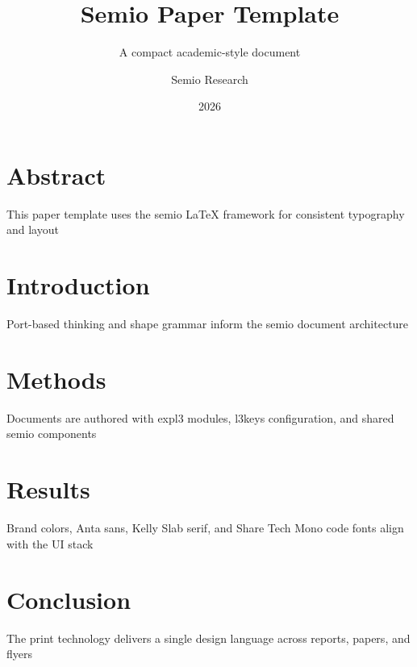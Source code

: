 \documentclass[type=paper,theme=light,language=en]{semio}
\title{Semio Paper Template}
\author{Semio Research}
\date{2026}
\subtitle{A compact academic-style document}
\begin{document}
\maketitle

\section{Abstract}
This paper template uses the semio LaTeX framework for consistent typography and layout

\section{Introduction}
Port-based thinking and shape grammar inform the semio document architecture

\section{Methods}
Documents are authored with expl3 modules, l3keys configuration, and shared semio components

\section{Results}
Brand colors, Anta sans, Kelly Slab serif, and Share Tech Mono code fonts align with the UI stack

\section{Conclusion}
The print technology delivers a single design language across reports, papers, and flyers
\end{document}
